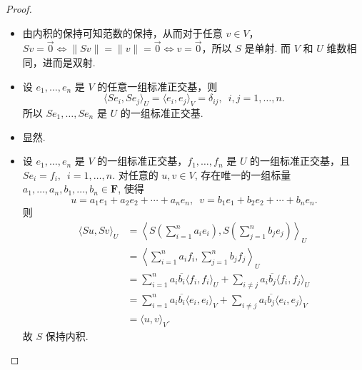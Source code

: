 \begin{proof}
    \begin{itemize} %
        \item[\ref*{item:20:保积同构条件:1}$\implies$\ref*{item:20:保积同构条件:2}] 由内积的保持可知范数的保持，从而对于任意 $v\in V$，$ Sv=\vec{0} \iff \|Sv\|=\|v\|=\vec{0} \iff v=\vec{0}$，所以 $ S $ 是单射. 而 $ V $ 和 $ U $ 维数相同，进而是双射.

        \item[\ref*{item:20:保积同构条件:2}$\implies$\ref*{item:20:保积同构条件:3}] 设 $ e_1, \ldots , e_n $ 是 $ V $ 的任意一组标准正交基，则
        \[ \langle Se_i, Se_j \rangle_U = \langle e_i, e_j \rangle_V = \delta_{ij},\enspace i, j = 1, \ldots , n. \]
        所以 $ Se_1, \ldots , Se_n $ 是 $ U $ 的一组标准正交基.

        \item[\ref*{item:20:保积同构条件:3}$\implies$\ref*{item:20:保积同构条件:4}] 显然.

        \item[\ref*{item:20:保积同构条件:4}$\implies$\ref*{item:20:保积同构条件:1}] 设 $ e_1, \ldots , e_n $ 是 $ V $ 的一组标准正交基，$ f_1, \ldots , f_n $ 是 $ U $ 的一组标准正交基，且 $ Se_i = f_i,\enspace i = 1, \ldots , n $. 对任意的 $ u, v \in V $, 存在唯一的一组标量 $ a_1, \ldots , a_n, b_1, \ldots , b_n \in \mathbf{F} $, 使得
        \[ u = a_1e_1 + a_2e_2 + \cdots + a_ne_n, \enspace v = b_1e_1 + b_2e_2 + \cdots + b_ne_n. \]
        则
        \begin{align*}
            \langle Su, Sv \rangle_U & = \left\langle S\left(\sum_{i=1}^{n} a_ie_i\right), S\left(\sum_{j=1}^{n} b_je_j\right) \right\rangle_U    \\
                                & = \left\langle \sum_{i=1}^{n} a_if_i, \sum_{j=1}^{n} b_jf_j \right\rangle_U   \\
                                & = \sum_{i=1}^{n} a_i\overline{b_i} \langle f_i, f_i \rangle_U + \sum_{i \neq j} a_i\overline{b_j} \langle f_i, f_j \rangle_U \\
                                & = \sum_{i=1}^{n} a_i\overline{b_i} \langle e_i, e_i \rangle_V + \sum_{i \neq j} a_i\overline{b_j} \langle e_i, e_j \rangle_V \\
                                & = \langle u, v \rangle_V.
        \end{align*}
        故 $ S $ 保持内积.
    \end{itemize}
\end{proof}

